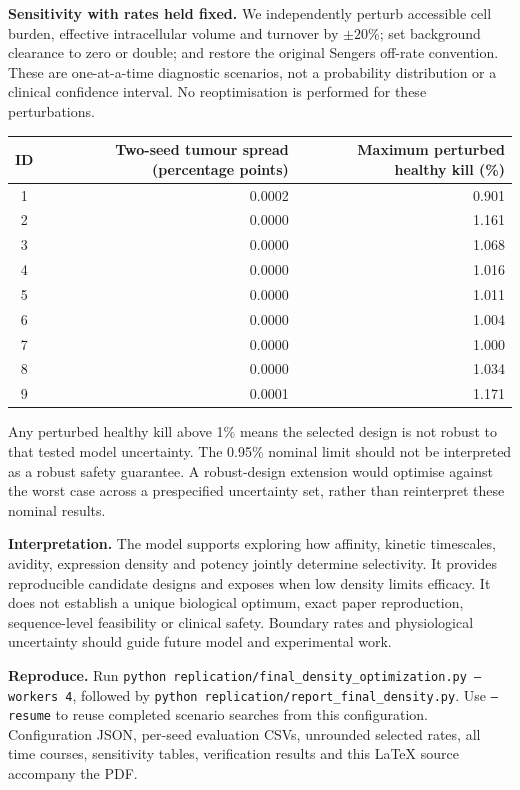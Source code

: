\documentclass[10pt,a4paper]{article}
\begin{document}
\textbf{Sensitivity with rates held fixed.} We independently perturb accessible cell burden, effective intracellular volume and turnover by $\pm20\%$; set background clearance to zero or double; and restore the original Sengers off-rate convention. These are one-at-a-time diagnostic scenarios, not a probability distribution or a clinical confidence interval. No reoptimisation is performed for these perturbations.
\begin{center}\small\begin{tabular}{crr}\toprule
ID & Two-seed tumour spread (percentage points) & Maximum perturbed healthy kill (\%)\\\midrule
1 & 0.0002 & 0.901 \\
2 & 0.0000 & 1.161 \\
3 & 0.0000 & 1.068 \\
4 & 0.0000 & 1.016 \\
5 & 0.0000 & 1.011 \\
6 & 0.0000 & 1.004 \\
7 & 0.0000 & 1.000 \\
8 & 0.0000 & 1.034 \\
9 & 0.0001 & 1.171 \\
\bottomrule\end{tabular}\end{center}
Any perturbed healthy kill above 1\% means the selected design is not robust to that tested model uncertainty. The 0.95\% nominal limit should not be interpreted as a robust safety guarantee. A robust-design extension would optimise against the worst case across a prespecified uncertainty set, rather than reinterpret these nominal results.

\textbf{Interpretation.} The model supports exploring how affinity, kinetic timescales, avidity, expression density and potency jointly determine selectivity. It provides reproducible candidate designs and exposes when low density limits efficacy. It does not establish a unique biological optimum, exact paper reproduction, sequence-level feasibility or clinical safety. Boundary rates and physiological uncertainty should guide future model and experimental work.

\textbf{Reproduce.} Run \texttt{python replication/final\_density\_optimization.py --workers 4}, followed by \texttt{python replication/report\_final\_density.py}. Use \texttt{--resume} to reuse completed scenario searches from this configuration. Configuration JSON, per-seed evaluation CSVs, unrounded selected rates, all time courses, sensitivity tables, verification results and this LaTeX source accompany the PDF.
\end{document}
